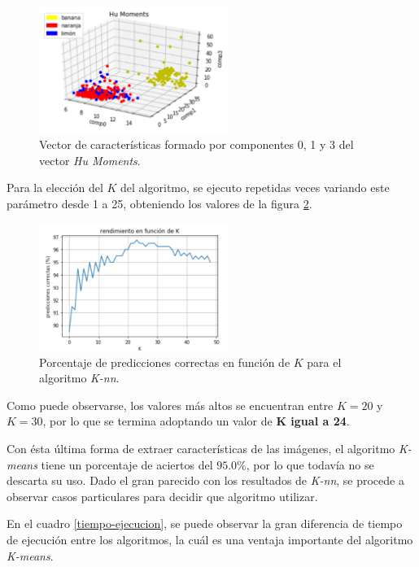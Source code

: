 \documentclass[10pt,a4paper]{article}
\begin{document}
\begin{figure}[h]
\centering
\includegraphics[width=0.55\textwidth]{imgs/final-feature.png}
\caption{Vector de características formado por componentes 0, 1 y 3 del vector \textit{Hu Moments}.}
\label{final-feature}
\end{figure}

Para la elección del $K$ del algoritmo, se ejecuto repetidas veces variando este parámetro desde 1 a 25, obteniendo los valores de la figura \ref{funcion-k}.

\begin{figure}[h]
\centering
\includegraphics[width=0.55\textwidth]{imgs/funcion-k.png}
\caption{Porcentaje de predicciones correctas en función de $K$ para el algoritmo \textit{K-nn}.}
\label{funcion-k}
\end{figure}

Como puede observarse, los valores más altos se encuentran entre $K=20$ y $K=30$, por lo que se termina adoptando un valor de \textbf{K igual a 24}.

Con ésta última forma de extraer características de las imágenes, el algoritmo \textit{K-means} tiene un porcentaje de aciertos del $95.0\%$, por lo que todavía no se descarta su uso. Dado el gran parecido con los resultados de \textit{K-nn}, se procede a observar casos particulares para decidir que algoritmo utilizar.

En el cuadro \ref{tiempo-ejecucion}, se puede observar la gran diferencia de tiempo de ejecución entre los algoritmos, la cuál es una ventaja importante del algoritmo \textit{K-means}.
\end{document}
